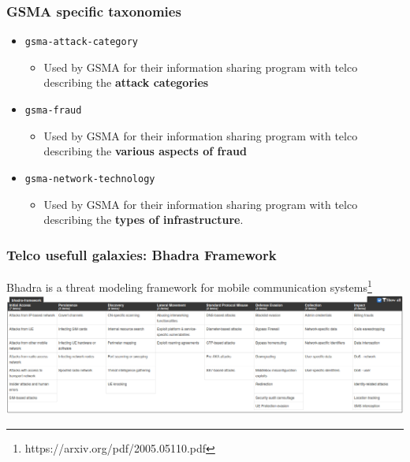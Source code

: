 \begin{frame}
    \frametitle{GSMA specific taxonomies}
    \begin{itemize}
        \item \texttt{gsma-attack-category}
        \begin{itemize}
            \item Used by GSMA for their information sharing program with telco describing the {\bf attack categories}
        \end{itemize}
        \item \texttt{gsma-fraud}
        \begin{itemize}
            \item Used by GSMA for their information sharing program with telco describing the {\bf various aspects of fraud}
        \end{itemize}
        \item \texttt{gsma-network-technology}
        \begin{itemize}
              \item Used by GSMA for their information sharing program with telco describing the {\bf types of infrastructure}.
        \end{itemize}
    \end{itemize}
\end{frame}


\begin{frame}
    \frametitle{Telco usefull galaxies: Bhadra Framework}
    Bhadra is a threat modeling framework for mobile communication systems\footnote{https://arxiv.org/pdf/2005.05110.pdf}
    \includegraphics[width=1.05\linewidth]{screenshots/bhadra-matrix.png}
\end{frame}

